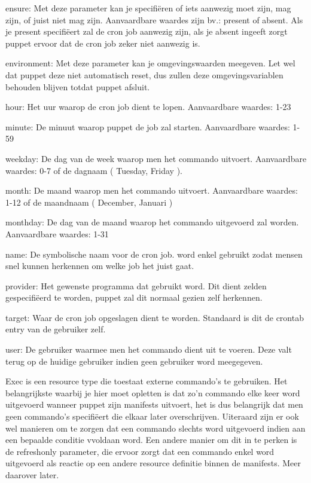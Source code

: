 		ensure:
		Met deze parameter kan je specifiëren of iets aanwezig moet zijn, mag zijn, of juist niet mag zijn.
		Aanvaardbare waardes zijn bv.: present of absent.
		Als je present specifiëert zal de cron job aanwezig zijn, als je absent ingeeft zorgt puppet ervoor dat de cron job zeker niet aanwezig is.

		environment:
		Met deze parameter kan je omgevingswaarden meegeven. Let wel dat puppet deze niet automatisch reset, dus zullen deze omgevingsvariablen behouden blijven totdat puppet afsluit.

		hour:
		Het uur waarop de cron job dient te lopen.
		Aanvaardbare waardes: 1-23

		minute:
		De minuut waarop puppet de job zal starten.
		Aanvaardbare waardes: 1-59

		weekday:
		De dag van de week waarop men het commando uitvoert.
		Aanvaardbare waardes: 0-7 of de dagnaam ( Tuesday, Friday ).

		month:
		De maand waarop men het commando uitvoert.
		Aanvaardbare waardes: 1-12 of de maandnaam ( December, Januari )

		monthday:
		De dag van de maand waarop het commando uitgevoerd zal worden.
		Aanvaardbare waardes: 1-31

		name:
		De symbolische naam voor de cron job.
		word enkel gebruikt zodat mensen snel kunnen herkennen om welke job het juist gaat.
		
		provider:
		Het gewenste programma dat gebruikt word.
		Dit dient zelden gespecifiëerd te worden, puppet zal dit normaal gezien zelf herkennen.

		target:
		Waar de cron job opgeslagen dient te worden.
		Standaard is dit de crontab entry van de gebruiker zelf.

		user:
		De gebruiker waarmee men het commando dient uit te voeren.
		Deze valt terug op de huidige gebruiker indien geen gebruiker word meegegeven.


	Exec is een resource type die toestaat externe commando's te gebruiken.
	Het belangrijkste waarbij je hier moet opletten is dat zo'n commando elke keer word uitgevoerd wanneer puppet zijn manifests uitvoert, het is dus belangrijk dat men geen commando's specifiëert die elkaar later overschrijven.
	Uiteraard zijn er ook wel manieren om te zorgen dat een commando slechts word uitgevoerd indien aan een bepaalde conditie vvoldaan word.
	Een andere manier om dit in te perken is de refreshonly parameter, die ervoor zorgt dat een commando enkel word uitgevoerd als reactie op een andere resource definitie binnen de manifests. Meer daarover later.

